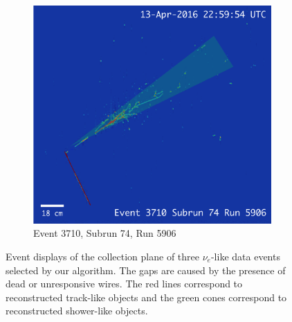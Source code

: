 \begin{figure}[htbp]
  \begin{subfigure}{0.45\textwidth}	
  \includegraphics[width=\linewidth]{figures/data1.png}
  \caption{Event 3710, Subrun 74, Run 5906}
\end{subfigure}

  \caption{Event displays of the collection plane of three $\nu_{e}$-like data events selected by our algorithm. The gaps are caused by the presence of dead or unresponsive wires. The red lines correspond to reconstructed track-like objects and the green cones correspond to reconstructed shower-like objects. }
  \label{fig:evds}
\end{figure}

